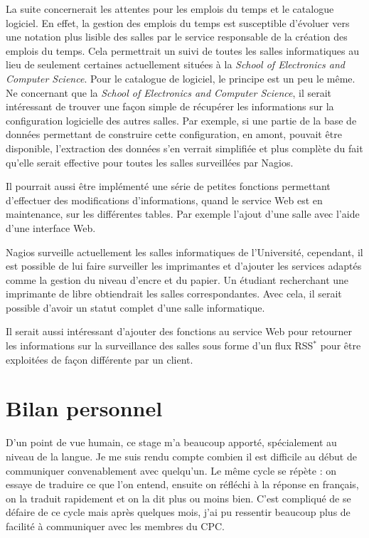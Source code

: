 La suite concernerait les attentes pour les emplois du temps et le catalogue logiciel.
En effet, la gestion des emplois du temps est susceptible d'\'evoluer vers une notation plus lisible des salles par le service responsable de la cr\'eation des emplois du temps.
Cela permettrait un suivi de toutes les salles informatiques au lieu de seulement certaines actuellement situ\'ees \`a la \textit{School of Electronics and Computer Science}.
Pour le catalogue de logiciel, le principe est un peu le m\^eme.
Ne concernant que la \textit{School of Electronics and Computer Science}, il serait int\'eressant de trouver une fa\c{c}on simple de r\'ecup\'erer les informations sur la configuration logicielle des autres salles.
Par exemple, si une partie de la base de donn\'ees permettant de construire cette configuration, en amont, pouvait \^etre disponible, l'extraction des donn\'ees s'en verrait simplifi\'ee et plus compl\`ete du fait qu'elle serait effective pour toutes les salles surveill\'ees par Nagios.

Il pourrait aussi \^etre impl\'ement\'e une s\'erie de petites fonctions permettant d'effectuer des modifications d'informations, quand le service Web est en maintenance, sur les diff\'erentes tables.
Par exemple l'ajout d'une salle avec l'aide d'une interface Web.

Nagios surveille actuellement les salles informatiques de l'Universit\'e, cependant, il est possible de lui faire surveiller les imprimantes et d'ajouter les services adapt\'es comme la gestion du niveau d'encre et du papier.
Un \'etudiant recherchant une imprimante de libre obtiendrait les salles correspondantes.
Avec cela, il serait possible d'avoir un statut complet d'une salle informatique.

Il serait aussi int\'eressant d'ajouter des fonctions au service Web pour retourner les informations sur la surveillance des salles sous forme d'un flux RSS$^*$ pour \^etre exploit\'ees de fa\c{c}on diff\'erente par un client.


\section{Bilan personnel}

D'un point de vue humain, ce stage m'a beaucoup apport\'e, sp\'ecialement au niveau de la langue.
Je me suis rendu compte combien il est difficile au d\'ebut de communiquer convenablement avec quelqu'un.
Le m\^eme cycle se r\'ep\`ete : on essaye de traduire ce que l'on entend, ensuite on r\'efl\'echi \`a la r\'eponse en fran\c{c}ais, on la traduit rapidement et on la dit plus ou moins bien.
C'est compliqu\'e de se d\'efaire de ce cycle mais apr\`es quelques mois, j'ai pu ressentir beaucoup plus de facilit\'e \`a communiquer avec les membres du CPC.

